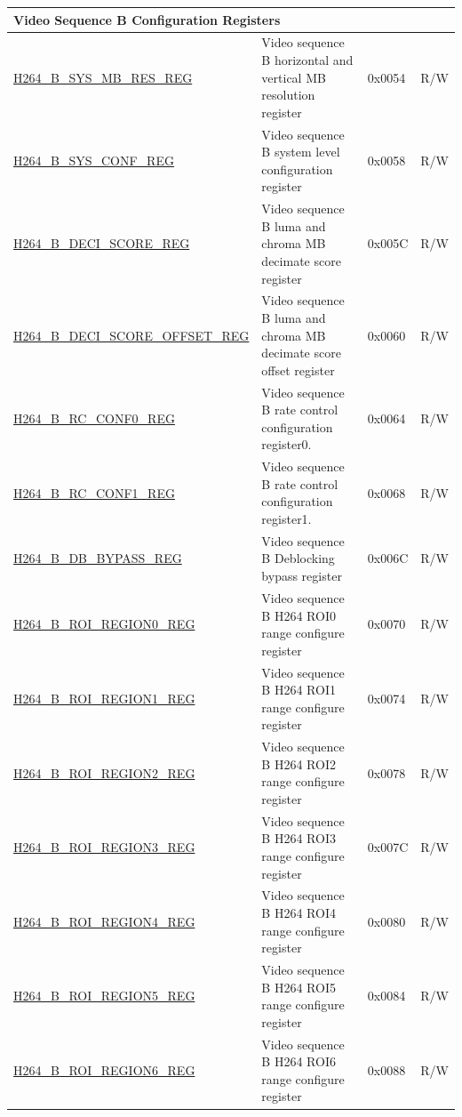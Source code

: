 \begin{longtable}{ | p{7cm} | p{6.2cm} | p{1.2cm} | p{1cm} | }
\multicolumn{4}{|l|}{\textbf{Video Sequence B Configuration Registers}} \\ \hline
\hyperref[regdesc:H264BSYSMBRESREG]{H264\_B\_SYS\_MB\_RES\_REG} & Video sequence B horizontal and vertical MB resolution register & 0x0054 & R/W \\ \hline
\hyperref[regdesc:H264BSYSCONFREG]{H264\_B\_SYS\_CONF\_REG} & Video sequence B system level configuration register & 0x0058 & R/W \\ \hline
\hyperref[regdesc:H264BDECISCOREREG]{H264\_B\_DECI\_SCORE\_REG} & Video sequence B luma and chroma MB decimate score register & 0x005C & R/W \\ \hline
\hyperref[regdesc:H264BDECISCOREOFFSETREG]{H264\_B\_DECI\_SCORE\_OFFSET\_REG} & Video sequence B luma and chroma MB decimate score offset register & 0x0060 & R/W \\ \hline
\hyperref[regdesc:H264BRCCONF0REG]{H264\_B\_RC\_CONF0\_REG} & Video sequence B rate control configuration register0. & 0x0064 & R/W \\ \hline
\hyperref[regdesc:H264BRCCONF1REG]{H264\_B\_RC\_CONF1\_REG} & Video sequence B rate control configuration register1. & 0x0068 & R/W \\ \hline
\hyperref[regdesc:H264BDBBYPASSREG]{H264\_B\_DB\_BYPASS\_REG} & Video sequence B Deblocking bypass register & 0x006C & R/W \\ \hline
\hyperref[regdesc:H264BROIREGION0REG]{H264\_B\_ROI\_REGION0\_REG} & Video sequence B H264 ROI0 range configure register & 0x0070 & R/W \\ \hline
\hyperref[regdesc:H264BROIREGION1REG]{H264\_B\_ROI\_REGION1\_REG} & Video sequence B H264 ROI1 range configure register & 0x0074 & R/W \\ \hline
\hyperref[regdesc:H264BROIREGION2REG]{H264\_B\_ROI\_REGION2\_REG} & Video sequence B H264 ROI2 range configure register & 0x0078 & R/W \\ \hline
\hyperref[regdesc:H264BROIREGION3REG]{H264\_B\_ROI\_REGION3\_REG} & Video sequence B H264 ROI3 range configure register & 0x007C & R/W \\ \hline
\hyperref[regdesc:H264BROIREGION4REG]{H264\_B\_ROI\_REGION4\_REG} & Video sequence B H264 ROI4 range configure register & 0x0080 & R/W \\ \hline
\hyperref[regdesc:H264BROIREGION5REG]{H264\_B\_ROI\_REGION5\_REG} & Video sequence B H264 ROI5 range configure register & 0x0084 & R/W \\ \hline
\hyperref[regdesc:H264BROIREGION6REG]{H264\_B\_ROI\_REGION6\_REG} & Video sequence B H264 ROI6 range configure register & 0x0088 & R/W \\ \hline

\end{longtable}
